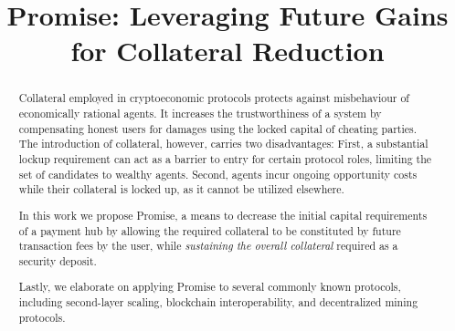 \documentclass[runningheads]{llncs}
\newcommand{\sys}{Promise\xspace}
\newcommand{\rk}[1]{\todo[linecolor=red,backgroundcolor=red!25,bordercolor=blue,inline,caption={}]{Comment by Rami: #1}}
\newcommand{\dom}[1]{\todo[linecolor=green,backgroundcolor=green!25,bordercolor=green,inline,caption={}]{Comment by Dominik: #1}}
\begin{document}
\title{
\sys: Leveraging Future Gains for Collateral Reduction
} 
\author{
}


\date{}
\maketitle


\begin{abstract}
Collateral employed in cryptoeconomic protocols protects against misbehaviour of economically rational agents.
It increases the trustworthiness of a system by compensating honest users for damages using the locked capital of cheating parties.
The introduction of collateral, however, carries two disadvantages:
First, a substantial lockup requirement can act as a barrier to entry for certain protocol roles, limiting the set of candidates to wealthy agents.
Second, agents incur ongoing opportunity costs while their collateral is locked up, as it cannot be utilized elsewhere.

In this work we propose \sys, a means to decrease the initial capital requirements of a payment hub by allowing the required collateral to be constituted by future transaction fees by the user, while \emph{sustaining the overall collateral} required as a security deposit.



Lastly, we elaborate on applying \sys to several commonly known protocols, including second-layer scaling, blockchain interoperability, and decentralized mining protocols.
\end{abstract}
\end{document}
